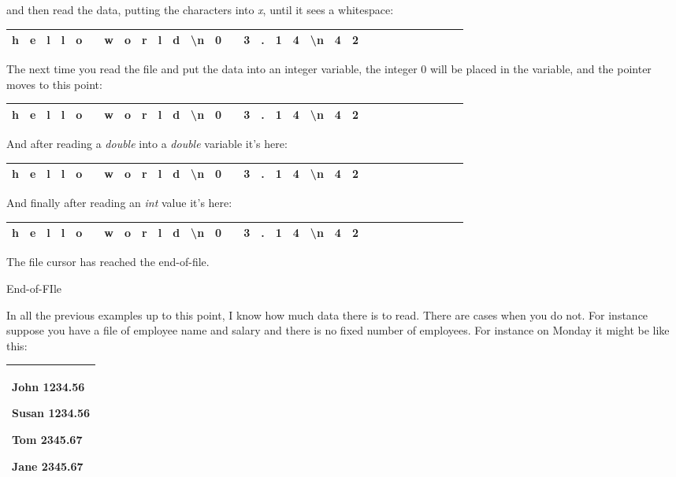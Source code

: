 \documentclass[
]{article}
\begin{document}
and then read the data, putting the characters into \emph{x}, until it
sees a whitespace:

\begin{longtable}[]{@{}llllllllllllllllllllllllllllll@{}}
\toprule
\endhead
h & e & l & l & o & & w & o & r & l & d & \textbackslash n & 0 & & 3 & .
& 1 & 4 & \textbackslash n & 4 & 2 & & & & & & & & &\tabularnewline
\bottomrule
\end{longtable}

The next time you read the file and put the data into an integer
variable, the integer 0 will be placed in the variable, and the pointer
moves to this point:

\begin{longtable}[]{@{}llllllllllllllllllllllllllllll@{}}
\toprule
\endhead
h & e & l & l & o & & w & o & r & l & d & \textbackslash n & 0 & & 3 & .
& 1 & 4 & \textbackslash n & 4 & 2 & & & & & & & & &\tabularnewline
\bottomrule
\end{longtable}

And after reading a \emph{double} into a \emph{double} variable it's
here:

\begin{longtable}[]{@{}llllllllllllllllllllllllllllll@{}}
\toprule
\endhead
h & e & l & l & o & & w & o & r & l & d & \textbackslash n & 0 & & 3 & .
& 1 & 4 & \textbackslash n & 4 & 2 & & & & & & & & &\tabularnewline
\bottomrule
\end{longtable}

And finally after reading an \emph{int} value it's here:

\begin{longtable}[]{@{}llllllllllllllllllllllllllllll@{}}
\toprule
\endhead
h & e & l & l & o & & w & o & r & l & d & \textbackslash n & 0 & & 3 & .
& 1 & 4 & \textbackslash n & 4 & 2 & & & & & & & & &\tabularnewline
\bottomrule
\end{longtable}

The file cursor has reached the end-of-file.

End-of-FIle

In all the previous examples up to this point, I know how much data
there is to read. There are cases when you do not. For instance suppose
you have a file of employee name and salary and there is no fixed number
of employees. For instance on Monday it might be like this:

\begin{longtable}[]{@{}l@{}}
\toprule
\endhead
\begin{minipage}[t]{0.97\columnwidth}\raggedright
John 1234.56

Susan 1234.56

Tom 2345.67

Jane 2345.67\strut
\end{minipage}\tabularnewline
\bottomrule
\end{longtable}
\end{document}
